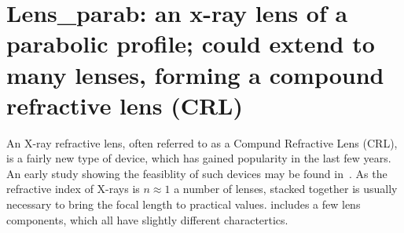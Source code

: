 \section{Lens\_parab: an x-ray lens of a parabolic profile; could extend to many lenses, forming a compound refractive lens (CRL)}
\label{lens-parab}

An X-ray refractive lens, often referred to as a Compund Refractive Lens (CRL), is a fairly new type of device, which has gained popularity in
the last few years. An early study showing the feasiblity of such devices may be found in~\cite{snigirev1996}. As the refractive index of X-rays
is $n\approx1$ a number of lenses, stacked together is usually necessary to bring the focal length to practical values. 
\MCX includes a few lens components, which all have slightly different charactertics.

